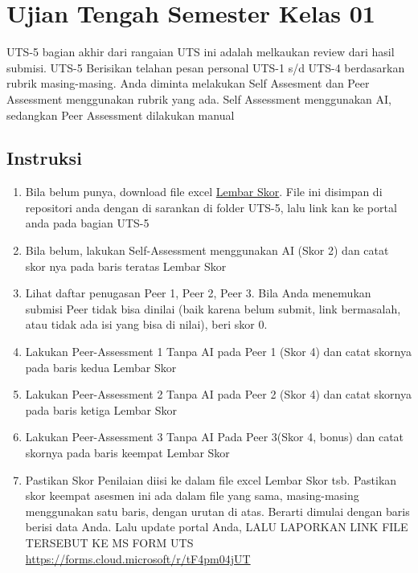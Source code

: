 \documentclass[
  letterpaper,
  DIV=11,
  numbers=noendperiod]{scrreprt}
\providecommand{\tightlist}{%
  \setlength{\itemsep}{0pt}\setlength{\parskip}{0pt}}
\begin{document}

\chapter{Ujian Tengah Semester Kelas
01}\label{ujian-tengah-semester-kelas-01}

UTS-5 bagian akhir dari rangaian UTS ini adalah melkaukan review dari
hasil submisi. UTS-5 Berisikan telahan pesan personal UTS-1 s/d UTS-4
berdasarkan rubrik masing-masing. Anda diminta melakukan Self Assesment
dan Peer Assessment menggunakan rubrik yang ada. Self Assessment
menggunakan AI, sedangkan Peer Assessment dilakukan manual

\section{Instruksi}\label{instruksi}

\begin{enumerate}
\def\labelenumi{\arabic{enumi}.}
\tightlist
\item
  Bila belum punya, download file excel
  \href{./asesmen/UTS-5_Skor.xlsx}{Lembar Skor}. File ini disimpan di
  repositori anda dengan di sarankan di folder UTS-5, lalu link kan ke
  portal anda pada bagian UTS-5
\item
  Bila belum, lakukan Self-Assessment menggunakan AI (Skor 2) dan catat
  skor nya pada baris teratas Lembar Skor
\item
  Lihat daftar penugasan Peer 1, Peer 2, Peer 3. Bila Anda menemukan
  submisi Peer tidak bisa dinilai (baik karena belum submit, link
  bermasalah, atau tidak ada isi yang bisa di nilai), beri skor 0.
\item
  Lakukan Peer-Assessment 1 Tanpa AI pada Peer 1 (Skor 4) dan catat
  skornya pada baris kedua Lembar Skor
\item
  Lakukan Peer-Assessment 2 Tanpa AI pada Peer 2 (Skor 4) dan catat
  skornya pada baris ketiga Lembar Skor
\item
  Lakukan Peer-Assessment 3 Tanpa AI Pada Peer 3(Skor 4, bonus) dan
  catat skornya pada baris keempat Lembar Skor
\item
  Pastikan Skor Penilaian diisi ke dalam file excel Lembar Skor tsb.
  Pastikan skor keempat asesmen ini ada dalam file yang sama,
  masing-masing menggunakan satu baris, dengan urutan di atas. Berarti
  dimulai dengan baris berisi data Anda. Lalu update portal Anda, LALU
  LAPORKAN LINK FILE TERSEBUT KE MS FORM UTS
  \url{https://forms.cloud.microsoft/r/tF4pm04jUT}
\end{enumerate}
\end{document}
